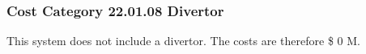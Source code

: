 \subsubsection*{Cost Category 22.01.08 Divertor}

This system does not include a divertor. The costs are therefore \$ 0 M.